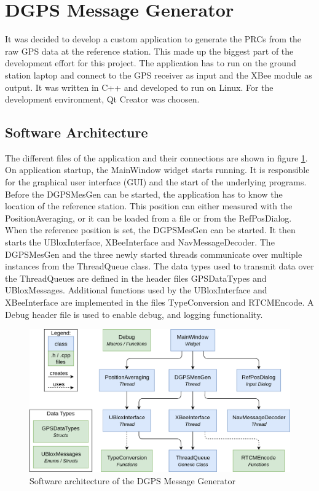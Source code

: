 \section{DGPS Message Generator}\label{sec:dgps_message_generator}

It was decided to develop a custom application to generate the PRCs from the raw GPS data at the reference station.
This made up the biggest part of the development effort for this project.
The application has to run on the ground station laptop and connect to the GPS receiver as input and the XBee module as output.
It was written in C++ and developed to run on Linux.
For the development environment, Qt Creator was choosen.

\newpage

\subsection{Software Architecture}

The different files of the application and their connections are shown in figure \ref{fig:software_architecture}.
On application startup, the MainWindow widget starts running.
It is responsible for the graphical user interface (GUI) and the start of the underlying programs.
Before the DGPSMesGen can be started, the application has to know the location of the reference station.
This position can either measured with the PositionAveraging, or it can be loaded from a file or from the RefPosDialog.
When the reference position is set, the DGPSMesGen can be started.
It then starts the UBloxInterface, XBeeInterface and NavMessageDecoder.
The DGPSMesGen and the three newly started threads communicate over multiple instances from the ThreadQueue class.
The data types used to transmit data over the ThreadQueues are defined in the header files GPSDataTypes and UBloxMessages.
Additional functions used by the UBloxInterface and XBeeInterface are implemented in the files TypeConversion and RTCMEncode.
A Debug header file is used to enable debug, and logging functionality.

\begin{figure}[ht]
 \centering
 \includegraphics[width=\textwidth]{images/Software_Architecture.png}
 \caption{Software architecture of the DGPS Message Generator}
 \label{fig:software_architecture}
\end{figure}

